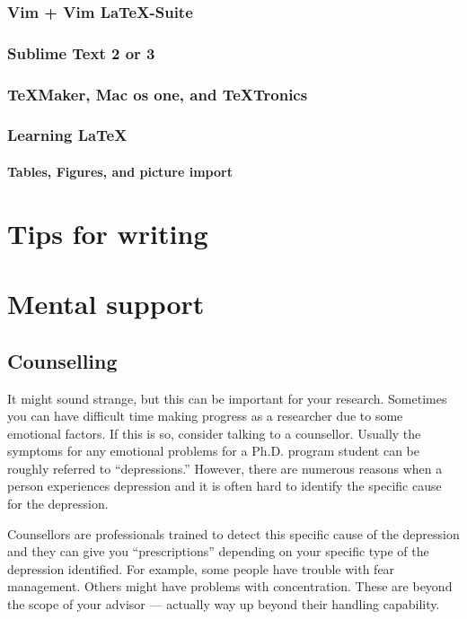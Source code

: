 \documentclass[11pt]{article}
\begin{document}
\subsubsection{Vim + Vim LaTeX-Suite}

\subsubsection{Sublime Text 2 or 3}

\subsubsection{TeXMaker, Mac os one, and TeXTronics}

\subsubsection{Learning LaTeX}


\paragraph{Tables, Figures, and picture import}


\section{Tips for writing}




\section{Mental support}

\subsection{Counselling}
It might sound strange, but this can be important for your research.
Sometimes you can have difficult time making progress as a researcher
due to some emotional factors. If this is so, consider talking to a
counsellor.  Usually the symptoms for any emotional problems for a Ph.D.
program student can be roughly referred to ``depressions.'' However,
there are numerous reasons when a person experiences depression and it
is often hard to identify the specific cause for the depression.

Counsellors are professionals trained to detect this specific cause of
the depression and they can give you ``prescriptions'' depending on your
specific type of the depression identified. For example, some people
have trouble with fear management. Others might have problems with
concentration. These are beyond the scope of your advisor --- actually
way up beyond their handling capability.
\end{document}
